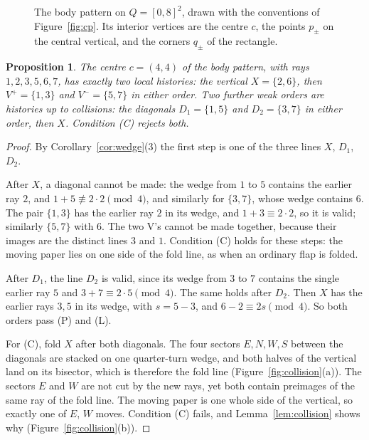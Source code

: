 \documentclass[11pt]{article}
\newtheorem{proposition}[theorem]{Proposition}
\theoremstyle{definition}
\theoremstyle{remark}
\begin{document}
\begin{figure}[t]
\centering
{}
\caption{The body pattern on $Q=[0,8]^2$, drawn with the conventions of Figure~\ref{fig:cp}. Its interior vertices are the centre $c$, the points $p_\pm$ on the central vertical, and the corners $q_\pm$ of the rectangle.}
\label{fig:body}
\end{figure}

\begin{proposition}\label{prop:c}
The centre $c=(4,4)$ of the body pattern, with rays $1,2,3,5,6,7$, has exactly two local histories: the vertical $X=\{2,6\}$, then $V^+=\{1,3\}$ and $V^-=\{5,7\}$ in either order. Two further weak orders are histories up to collisions: the diagonals $D_1=\{1,5\}$ and $D_2=\{3,7\}$ in either order, then $X$. Condition (C) rejects both.
\end{proposition}

\begin{proof}
By Corollary~\ref{cor:wedge}(3) the first step is one of the three lines $X$, $D_1$, $D_2$.

After $X$, a diagonal cannot be made: the wedge from $1$ to $5$ contains the earlier ray $2$, and $1+5\not\equiv2\cdot2\pmod4$, and similarly for $\{3,7\}$, whose wedge contains $6$. The pair $\{1,3\}$ has the earlier ray $2$ in its wedge, and $1+3\equiv2\cdot2$, so it is valid; similarly $\{5,7\}$ with $6$. The two V's cannot be made together, because their images are the distinct lines $3$ and $1$. Condition (C) holds for these steps: the moving paper lies on one side of the fold line, as when an ordinary flap is folded.

After $D_1$, the line $D_2$ is valid, since its wedge from $3$ to $7$ contains the single earlier ray $5$ and $3+7\equiv2\cdot5\pmod 4$. The same holds after $D_2$. Then $X$ has the earlier rays $3,5$ in its wedge, with $s=5-3$, and $6-2\equiv 2s\pmod4$. So both orders pass (P) and (L).

For (C), fold $X$ after both diagonals. The four sectors $E,N,W,S$ between the diagonals are stacked on one quarter-turn wedge, and both halves of the vertical land on its bisector, which is therefore the fold line (Figure~\ref{fig:collision}(a)). The sectors $E$ and $W$ are not cut by the new rays, yet both contain preimages of the same ray of the fold line. The moving paper is one whole side of the vertical, so exactly one of $E$, $W$ moves. Condition (C) fails, and Lemma~\ref{lem:collision} shows why (Figure~\ref{fig:collision}(b)).
\end{proof}
\end{document}

